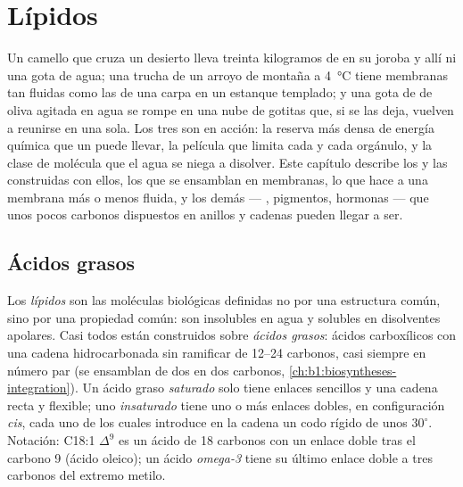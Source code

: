 \chapter{Lípidos}\label{ch:b1:lipids}

Un camello que cruza un desierto lleva treinta kilogramos de  en su
joroba y allí ni una gota de agua; una trucha de un arroyo de montaña a
\qty{4}{\celsius} tiene membranas tan fluidas como las de una carpa en un
estanque templado; y una gota de  de oliva agitada en agua se rompe en
una nube de gotitas que, si se las deja, vuelven a reunirse en una sola. Los
tres son  en acción: la reserva más densa de energía química que un
 puede llevar, la película que limita cada  y cada orgánulo,
y la clase de molécula que el agua se niega a disolver. Este capítulo
describe los  y las  construidas con ellos, los 
 que se ensamblan en membranas, lo que hace a una membrana más o
menos fluida, y los demás  --- , pigmentos, hormonas --- que
unos pocos carbonos dispuestos en anillos y cadenas pueden llegar a ser.

\section{Ácidos grasos}

\begin{definition}\label{def:b1:lipids:fattyacid}
Los \emph{lípidos} son las moléculas biológicas definidas no
por una estructura común, sino por una propiedad común: son insolubles en
agua y solubles en disolventes apolares. Casi todos están construidos sobre
\emph{ácidos grasos}: ácidos carboxílicos con una cadena
hidrocarbonada sin ramificar de \qtyrange{12}{24}{} carbonos, casi siempre
en número par (se ensamblan de dos en dos carbonos,
\cref{ch:b1:biosyntheses-integration}). Un ácido graso
\emph{saturado} solo tiene enlaces sencillos y
una cadena recta y flexible; uno \emph{insaturado} tiene uno o más enlaces dobles, en configuración \emph{cis},
cada uno de los cuales introduce en la cadena un codo rígido de unos
$30^\circ$. Notación: C18:1 $\Delta^9$ es un ácido de 18 carbonos con un
enlace doble tras el carbono 9 (ácido oleico); un ácido \emph{omega-3} tiene
su último enlace doble a tres carbonos del extremo metilo.
\end{definition}

